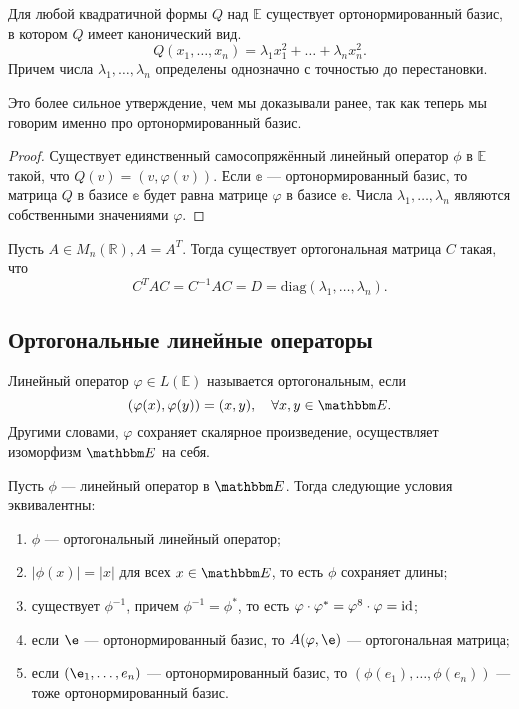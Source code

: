 \begin{Consequence}
	Для любой квадратичной формы $Q$ над $\mathbb{E}$ существует ортонормированный базис, в котором $Q$ имеет канонический вид. 
	$$
	Q(x_1, \ldots, x_n) = \lambda_1 x_1^2 + \ldots + \lambda_n x_n^2.
	$$
	Причем числа $\lambda_1, \ldots, \lambda_n$ определены однозначно с точностью до перестановки.
\end{Consequence}

Это более сильное утверждение, чем мы доказывали ранее, так как теперь мы говорим именно про ортонормированный базис.

\begin{proof}
	Существует единственный самосопряжённый линейный оператор $\phi$ в $\mathbb{E}$ такой, что $Q(v) = (v, \varphi(v))$. Если $\mathbb{e}$ --- ортонормированный базис, то матрица $Q$ в базисе $\mathbb{e}$ будет равна матрице $\varphi$ в базисе $\mathbb{e}$. Числа $\lambda_1, \ldots, \lambda_n$ являются собственными значениями $\varphi$. 
\end{proof}

\begin{Consequence}
	Пусть $A\in M_n(\mathbb{R}), A = A^T$. Тогда существует ортогональная матрица $C$ такая, что 
	$$
	C^TAC = C^{-1} AC = D = \mathrm{diag}(\lambda_1, \ldots, \lambda_n).
	$$
\end{Consequence}

\subsection{Ортогональные линейные операторы}

\begin{Def}
	Линейный оператор $\varphi \in L(\mathbb{E})$ называется ортогональным, если
	$$
	(\varphi(x), \varphi(y)) = (x,y), \quad \forall x, y \in \E.
	$$
	Другими словами, $\varphi$ сохраняет скалярное произведение, осуществляет изоморфизм $\E$ на себя.
\end{Def}

\begin{Suggestion}
Пусть $\phi$ --- линейный оператор в $\E$. Тогда следующие условия эквивалентны:
\begin{enumerate}
\item $\phi$ --- ортогональный линейный оператор;
\item $|\phi(x)| = |x|$ для всех $x \in \E$, то есть $\phi$ сохраняет длины;
\item существует $\phi^{-1}$, причем $\phi^{-1} = \phi^*$, то есть $\varphi \cdot \varphi^* = \varphi^8\cdot \varphi = \mathrm{id}$;
\item если $\e$ --- ортонормированный базис, то $A(\phi, \e)$ --- ортогональная матрица;
\item если $(\e_1, \ldots, e_n)$ --- ортонормированный базис, то $(\phi(e_1), \ldots, \phi(e_n))$ --- тоже ортонормированный базис.
\end{enumerate}
\end{Suggestion}

